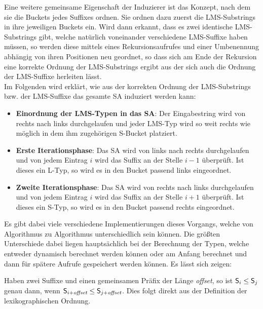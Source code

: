 Eine weitere gemeinsame Eigenschaft der Induzierer ist das Konzept, nach dem sie die Buckets jedes Suffixes ordnen. Sie ordnen dazu zuerst die LMS-Substrings in ihre jeweiligen Buckets ein. Wird dann erkannt, dass es zwei identische LMS-Substrings gibt, welche natürlich voneinander verschiedene LMS-Suffixe haben müssen, so werden diese mittels eines Rekursionsaufrufes und einer Umbenennung abhängig von ihren Positionen neu geordnet, so dass sich am Ende der Rekursion eine korrekte Ordnung der LMS-Substrings ergibt aus der sich auch die Ordnung der LMS-Suffixe herleiten lässt. \\
Im Folgenden wird erklärt, wie aus der korrekten Ordnung der LMS-Substrings bzw. der LMS-Suffixe das gesamte SA induziert werden kann:
\begin{itemize}
\item \textbf{Einordnung der LMS-Typen in das SA}: Der Eingabestring wird von rechts nach links durchgelaufen und jeder LMS-Typ wird so weit rechts wie möglich in dem ihm zugehörigen S-Bucket platziert.
\item \textbf{Erste Iterationsphase}: Das SA wird von links nach rechts durchgelaufen und von jedem Eintrag $i$ wird das Suffix an der Stelle $i-1$ überprüft. Ist dieses ein L-Typ, so wird es in den Bucket passend links eingeordnet.
\item \textbf{Zweite Iterationsphase}: Das SA wird von rechts nach links durchgelaufen und von jedem Eintrag $i$ wird das Suffix an der Stelle $i+1$ überprüft. Ist dieses ein S-Typ, so wird es in den Bucket passend rechts eingeordnet.
\end{itemize}

Es gibt dabei viele verschiedene Implementierungen dieses Vorgangs, welche von Algorithmus zu Algorithmus unterschiedlich sein können. Die größten Unterschiede dabei liegen hauptsächlich bei der Berechnung der Typen, welche entweder dynamisch berechnet werden können oder am Anfang berechnet und dann für spätere Aufrufe gespeichert werden können. Es lässt sich zeigen:

\begin{lemma}
	\label{lemma:common_prefix}
	\normalfont
    Haben zwei Suffixe  und  einen gemeinsamen Präfix der Länge {\textit{offset}\xspace}, so ist \(\mathsf{S}_{i} \leq \mathsf{S}_{j}\) genau dann, wenn \(\mathsf{S}_{i+{\textit{offset}}} \leq \mathsf{S}_{j+{\textit{offset}}}\). Dies folgt direkt aus der Definition der lexikographischen Ordnung.
\end{lemma}

